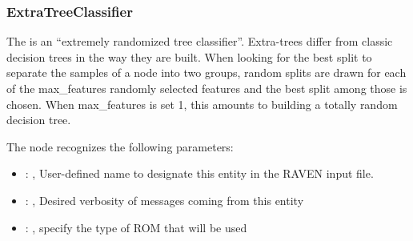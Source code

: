 \subsubsection{ExtraTreeClassifier}
  The  is an ``extremely randomized tree classifier''.
  Extra-trees differ from classic decision trees in the way they are built. When looking for the
  best                          split to separate the samples of a node into two groups, random
  splits are drawn for each of the                          max\_features randomly selected features
  and the best split among those is chosen. When max\_features                          is set 1,
  this amounts to building a totally random decision tree.

  The  node recognizes the following parameters:
    \begin{itemize}
      \item {}: , 
        User-defined name to designate this entity in the RAVEN input file.
      \item {}: , 
        Desired verbosity of messages coming from this entity
      \item {}: , 
        specify the type of ROM that will be used
  \end{itemize}

